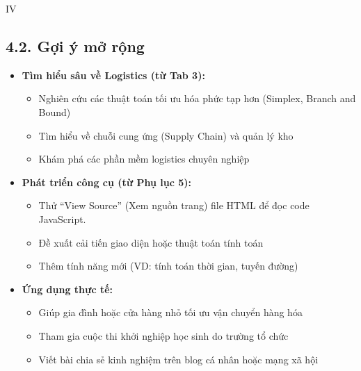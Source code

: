 \documentclass[12pt,a4paper]{article}
\begin{document}
\begin{competitionsection}{IV}
\subsection*{4.2. Gợi ý mở rộng}
\begin{itemize}[leftmargin=*,noitemsep]
\item \textbf{Tìm hiểu sâu về Logistics (từ Tab 3):}
    \begin{itemize}
    \item Nghiên cứu các thuật toán tối ưu hóa phức tạp hơn (Simplex, Branch and Bound)
    \item Tìm hiểu về chuỗi cung ứng (Supply Chain) và quản lý kho
    \item Khám phá các phần mềm logistics chuyên nghiệp
    \end{itemize}
\item \textbf{Phát triển công cụ (từ Phụ lục 5):}
    \begin{itemize}
    \item Thử ``View Source'' (Xem nguồn trang) file HTML để đọc code JavaScript.
    \item Đề xuất cải tiến giao diện hoặc thuật toán tính toán
    \item Thêm tính năng mới (VD: tính toán thời gian, tuyến đường)
    \end{itemize}
\item \textbf{Ứng dụng thực tế:}
    \begin{itemize}
    \item Giúp gia đình hoặc cửa hàng nhỏ tối ưu vận chuyển hàng hóa
    \item Tham gia cuộc thi khởi nghiệp học sinh do trường tổ chức
    \item Viết bài chia sẻ kinh nghiệm trên blog cá nhân hoặc mạng xã hội
    \end{itemize}
\end{itemize}
\end{competitionsection}
\newpage
\end{document}
